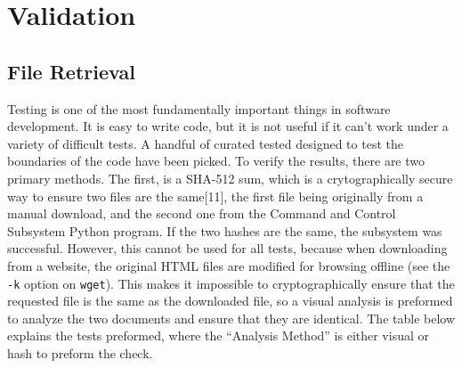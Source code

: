 \documentclass{article}
\begin{document}
\section{Validation}

\subsection{File Retrieval}
Testing is one of the most fundamentally important things in software
development. It is easy to write code, but it is not useful if it
can't work under a variety of difficult tests. A handful of curated
tested designed to test the boundaries of the code have been
picked. To verify the results, there are two primary methods. The
first, is a SHA-512 sum, which is a crytographically secure way to
ensure two files are the same[11], the first file being originally from a
manual download, and the second one from the Command and Control
Subsystem Python program. If the two hashes are the same, the subsystem was
successful. However, this cannot be used for all
tests, because when downloading from a website, the original HTML files
are modified for browsing offline (see the \texttt{-k} option on
\texttt{wget}). This makes it impossible to cryptographically ensure that the
requested file is the same as the downloaded file, so a visual
analysis is preformed to analyze the two documents and ensure that
they are identical. The table below explains the tests preformed,
where the ``Analysis Method'' is either visual or hash to preform the
check. 
\end{document}
